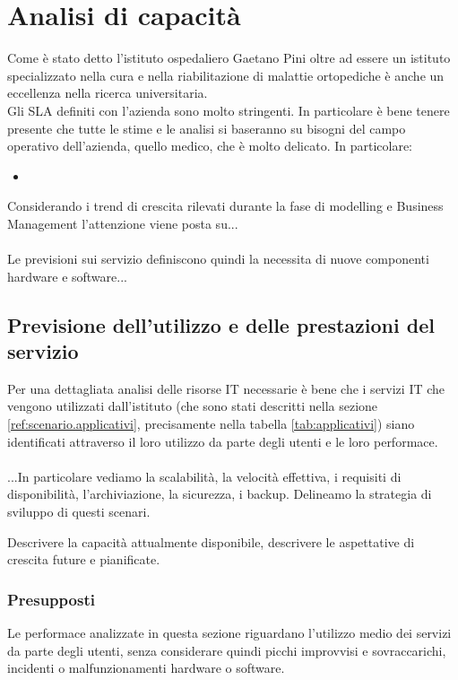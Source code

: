 \newpage
\section{Analisi di capacità} \label{ref:capacita}
Come è stato detto l'istituto ospedaliero Gaetano Pini oltre ad essere un istituto specializzato nella cura e nella riabilitazione di malattie ortopediche è anche un eccellenza nella ricerca universitaria. \\
Gli SLA definiti con l'azienda sono molto stringenti. In particolare è bene tenere presente che tutte le stime e le analisi si baseranno su bisogni del campo operativo dell'azienda, quello medico, che è molto delicato. In particolare:
\begin{itemize}
	\item 
\end{itemize}

Considerando i trend di crescita rilevati durante la fase di modelling e Business Management l'attenzione viene posta su...
\\
\\
Le previsioni sui servizio definiscono quindi la necessita di nuove componenti hardware e software...
\\

\subsection{Previsione dell'utilizzo e delle prestazioni del servizio}
	Per una dettagliata analisi delle risorse IT necessarie è bene che i servizi IT che vengono utilizzati dall'istituto (che sono stati descritti nella sezione \ref{ref:scenario.applicativi}, precisamente nella tabella \ref{tab:applicativi}) siano identificati attraverso il loro utilizzo da parte degli utenti e le loro performace. \\
	\\
	...In particolare vediamo la scalabilità, la velocità effettiva, i requisiti di disponibilità, l'archiviazione, la sicurezza, i backup.
	Delineamo la strategia di sviluppo di questi scenari.
	
	Descrivere la capacità attualmente disponibile, descrivere le aspettative di crescita future e pianificate.

	\subsubsection{Presupposti}
	Le performace analizzate in questa sezione riguardano l'utilizzo medio dei servizi da parte degli utenti, senza considerare quindi picchi improvvisi e sovraccarichi, incidenti o malfunzionamenti hardware o software.
